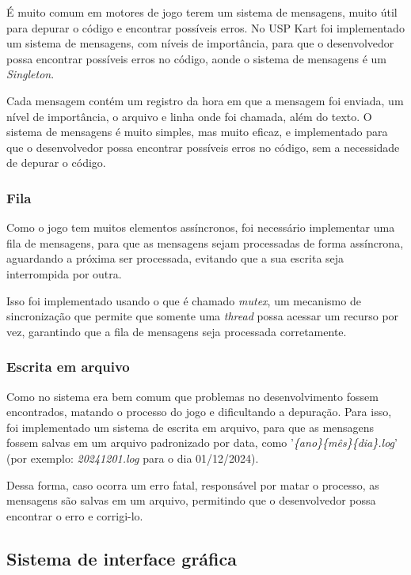 É muito comum em motores de jogo terem um sistema de mensagens, muito útil para depurar o código e encontrar possíveis erros. No USP Kart foi implementado um sistema de mensagens, com níveis de importância, para que o desenvolvedor possa encontrar possíveis erros no código, aonde o sistema de mensagens é um \textit{Singleton}.

Cada mensagem contém um registro da hora em que a mensagem foi enviada, um nível de importância, o arquivo e linha onde foi chamada, além do texto. O sistema de mensagens é muito simples, mas muito eficaz, e implementado para que o desenvolvedor possa encontrar possíveis erros no código, sem a necessidade de depurar o código.

\subsubsection{Fila}

Como o jogo tem muitos elementos assíncronos, foi necessário implementar uma fila de mensagens, para que as mensagens sejam processadas de forma assíncrona, aguardando a próxima ser processada, evitando que a sua escrita seja interrompida por outra.

Isso foi implementado usando o que é chamado \textit{mutex}, um mecanismo de sincronização que permite que somente uma \textit{thread} possa acessar um recurso por vez, garantindo que a fila de mensagens seja processada corretamente.

\subsubsection{Escrita em arquivo}

Como no sistema era bem comum que problemas no desenvolvimento fossem encontrados, matando o processo do jogo e dificultando a depuração. Para isso, foi implementado um sistema de escrita em arquivo, para que as mensagens fossem salvas em um arquivo padronizado por data, como '\textit{\{ano\}\{mês\}\{dia\}.log}' (por exemplo: \textit{20241201.log} para o dia 01/12/2024).

Dessa forma, caso ocorra um erro fatal, responsável por matar o processo, as mensagens são salvas em um arquivo, permitindo que o desenvolvedor possa encontrar o erro e corrigi-lo.

\subsection{Sistema de interface gráfica}

